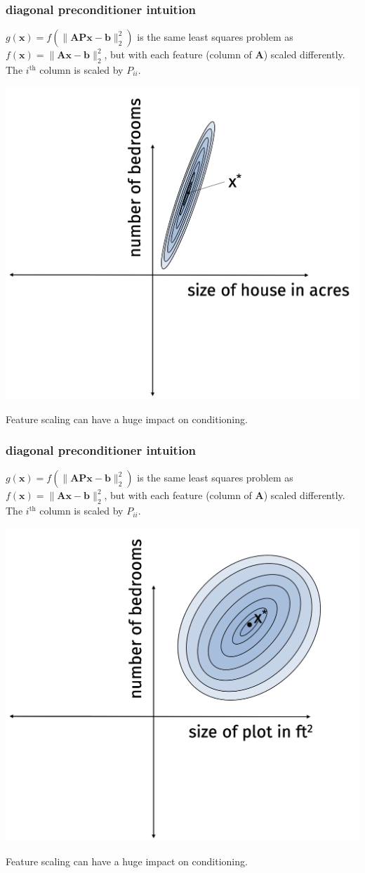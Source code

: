 \documentclass[compress]{beamer}
\newcommand{\bv}[1]{\mathbf{#1}}
\begin{document}
\begin{frame}
	\frametitle{diagonal preconditioner intuition}
	$g(\bv{x}) = f(\|\bv{A}\bv{P}\bv{x} - \bv{b}\|_2^2)$ is the same least squares problem as $f(\bv{x}) = \|\bv{A}\bv{x} - \bv{b}\|_2^2$, but with each feature (column of $\bv{A}$) scaled differently. The $i^\text{th}$ column is scaled by $P_{ii}$. 
	\begin{center}
	\vspace{-.5em}
	\includegraphics*[width=.6\textwidth]{bad_scaling.png}
	\vspace{-.5em}
	
	Feature scaling can have a huge impact on conditioning. 
	\end{center}
\end{frame}

\begin{frame}
	\frametitle{diagonal preconditioner intuition}
	$g(\bv{x}) = f(\|\bv{A}\bv{P}\bv{x} - \bv{b}\|_2^2)$ is the same least squares problem as $f(\bv{x}) = \|\bv{A}\bv{x} - \bv{b}\|_2^2$, but with each feature (column of $\bv{A}$) scaled differently. The $i^\text{th}$ column is scaled by $P_{ii}$. 
	\begin{center}
		\vspace{-.5em}
		\includegraphics*[width=.6\textwidth]{well_conditioned.png}
		\vspace{-.5em}
		
		Feature scaling can have a huge impact on conditioning. 
	\end{center}
\end{frame}
\end{document}
